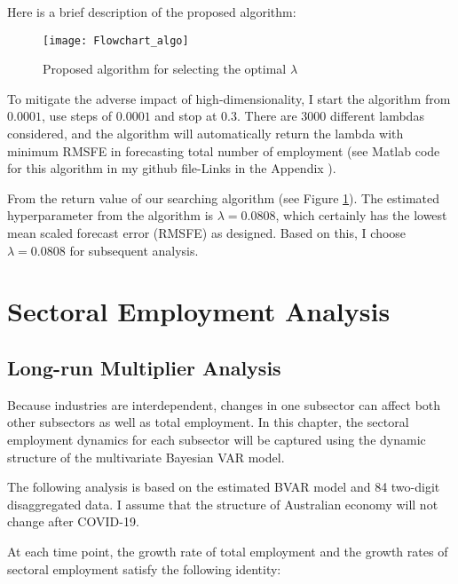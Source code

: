 \documentclass{monashthesis}
\begin{document}
Here is a brief description of the proposed algorithm:

\graphicspath{ {/Users/elvisyang/Desktop/hon_proj/Disaggregated_Employment/Honours_thesis/figures} }

\begin{figure}[ht]
\texttt{[image: Flowchart\_algo]}
\centering
\caption{Proposed algorithm for selecting the optimal $\lambda$}
\label{fig:sealgo}
\end{figure}

To mitigate the adverse impact of high-dimensionality, I start the algorithm from \(0.0001\), use steps of \(0.0001\) and stop at \(0.3\). There are 3000 different lambdas considered, and the algorithm will automatically return the lambda with minimum RMSFE in forecasting total number of employment (see Matlab code for this algorithm in my github file-Links in the Appendix ).

From the return value of our searching algorithm (see Figure \ref{fig:sealgo}). The estimated hyperparameter from the algorithm is \(\lambda=0.0808\), which certainly has the lowest mean scaled forecast error (RMSFE) as designed. Based on this, I choose \(\lambda=0.0808\) for subsequent analysis.

\newpage

\hypertarget{sectoral-employment-analysis}{%
\chapter{Sectoral Employment Analysis}\label{sectoral-employment-analysis}}

\hypertarget{long-run-multiplier-analysis}{%
\section{Long-run Multiplier Analysis}\label{long-run-multiplier-analysis}}

Because industries are interdependent, changes in one subsector can affect both other subsectors as well as total employment. In this chapter, the sectoral employment dynamics for each subsector will be captured using the dynamic structure of the multivariate Bayesian VAR model.

The following analysis is based on the estimated BVAR model and 84 two-digit disaggregated data. I assume that the structure of Australian economy will not change after COVID-19.

At each time point, the growth rate of total employment and the growth rates of sectoral employment satisfy the following identity:
\end{document}
